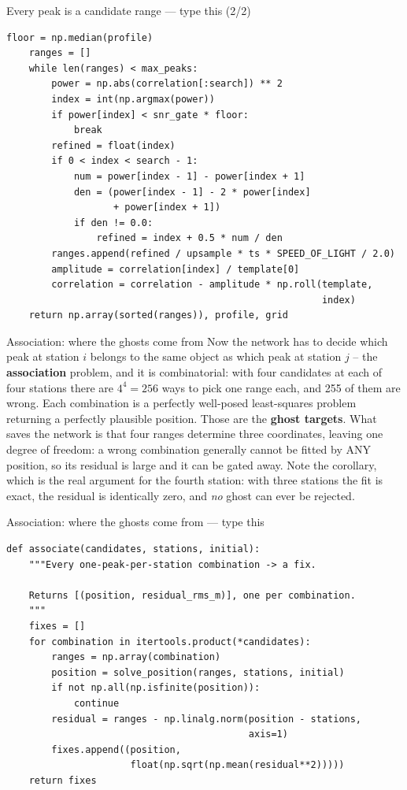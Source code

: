 \documentclass[10pt]{beamer}
\begin{document}
\begin{frame}[fragile]{Every peak is a candidate range --- type this (2/2)}
\begin{lstlisting}[basicstyle=\ttfamily\tiny]
    floor = np.median(profile)
    ranges = []
    while len(ranges) < max_peaks:
        power = np.abs(correlation[:search]) ** 2
        index = int(np.argmax(power))
        if power[index] < snr_gate * floor:
            break
        refined = float(index)
        if 0 < index < search - 1:
            num = power[index - 1] - power[index + 1]
            den = (power[index - 1] - 2 * power[index]
                   + power[index + 1])
            if den != 0.0:
                refined = index + 0.5 * num / den
        ranges.append(refined / upsample * ts * SPEED_OF_LIGHT / 2.0)
        amplitude = correlation[index] / template[0]
        correlation = correlation - amplitude * np.roll(template,
                                                        index)
    return np.array(sorted(ranges)), profile, grid
\end{lstlisting}
\end{frame}

\begin{frame}{Association: where the ghosts come from}
  Now the network has to decide which peak at station $i$
  belongs to the same object as which peak at station $j$
  -- the \textbf{association} problem, and it is
  combinatorial: with four candidates at each of four
  stations there are $4^4 = 256$ ways to pick one range
  each, and 255 of them are wrong. Each combination is a
  perfectly well-posed least-squares problem returning a
  perfectly plausible position. Those are the
  \textbf{ghost targets}. What saves the network is that
  four ranges determine three coordinates, leaving one
  degree of freedom: a wrong combination generally cannot
  be fitted by ANY position, so its residual is large and
  it can be gated away. Note the corollary, which is the
  real argument for the fourth station: with three
  stations the fit is exact, the residual is identically
  zero, and \emph{no} ghost can ever be rejected.
\end{frame}

\begin{frame}[fragile]{Association: where the ghosts come from --- type this}
\begin{lstlisting}[basicstyle=\ttfamily\tiny]
def associate(candidates, stations, initial):
    """Every one-peak-per-station combination -> a fix.

    Returns [(position, residual_rms_m)], one per combination.
    """
    fixes = []
    for combination in itertools.product(*candidates):
        ranges = np.array(combination)
        position = solve_position(ranges, stations, initial)
        if not np.all(np.isfinite(position)):
            continue
        residual = ranges - np.linalg.norm(position - stations,
                                           axis=1)
        fixes.append((position,
                      float(np.sqrt(np.mean(residual**2)))))
    return fixes
\end{lstlisting}
\end{frame}
\end{document}
